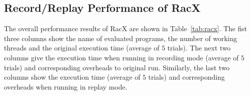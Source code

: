 \documentclass[10pt,onecolumn,letterpaper]{article}
\begin{document}
\subsection{Record/Replay Performance of RacX}
The overall performance results of RacX are shown in
Table~\ref{tab:racx}. The fist three columns show the name of
evaluated programs, the number of working threads and the original
execution time (average of $5$ trials). The next two columns give
the execution time when running in recording mode (average of $5$
trials) and corresponding overheads to original run. Similarly, the
last two columns show the execution time (average of $5$ trials) and
corresponding overheads when running in replay mode.

\begin{table}
\caption{Performance of RacX when running with record- and replay-
mode compared with original execution. We vary the number of threads
from 1 to 16 to demonstrates the scalability of
RacX.}\label{tab:racx}
\end{table}
\end{document}
